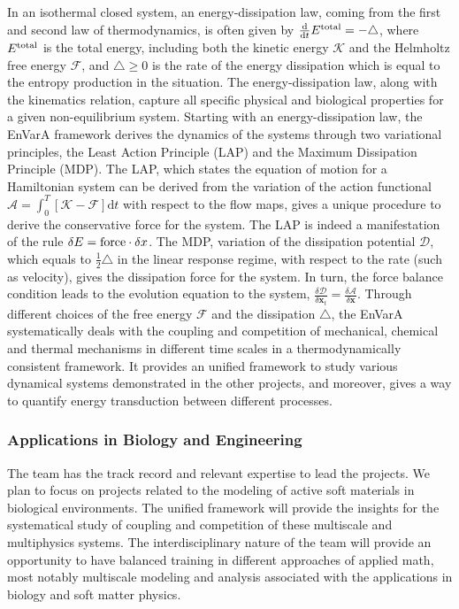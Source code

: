 \documentclass[11pt]{NSFamsart}
\newcommand{\dd}{\mathrm{d}}
\newcommand{\x}{{\bm x}}
\begin{document}
In an isothermal closed system, an energy-dissipation law, coming from the first and second law of thermodynamics, is often given by $\frac{\dd}{\dd t} E^{\rm total} = - \triangle$,
where $E^{\rm total}$ is the total energy, including both the kinetic energy $\mathcal{K}$ and the Helmholtz free energy $\mathcal{F}$, and $\triangle \geq 0$ is the rate of the energy dissipation which is equal to the entropy production in the situation. The energy-dissipation law, along with the kinematics relation, %
capture all specific physical and biological properties for a given non-equilibrium system. Starting with an energy-dissipation law, the EnVarA framework derives the dynamics of the systems through two variational principles, the Least Action Principle (LAP) and the Maximum Dissipation Principle (MDP). The LAP, which states the equation of motion for a Hamiltonian system
can be derived from the variation of the action functional $\mathcal{A} = \int_{0}^T [\mathcal{K} - \mathcal{F}] \dd t$ with respect to the flow maps, gives a unique procedure to derive the conservative force for the system. The LAP is indeed a manifestation of the rule $\delta E = {\rm force} \cdot \delta x$. The MDP, variation of the dissipation potential $\mathcal{D}$, which equals to $\frac{1}{2}\triangle$ in the linear response regime, with respect to the rate (such as velocity), gives the dissipation force for the system. In turn, the force balance condition leads to the evolution equation to the system, $\frac{\delta \mathcal{D}}{\delta \x_t} = \frac{\delta \mathcal{A}}{\delta \x}.$ Through different choices of the free energy $\mathcal{F}$ and the dissipation $\triangle$,
the EnVarA %
systematically deals with the coupling and competition of mechanical, chemical and thermal mechanisms in different time scales in a thermodynamically consistent framework. It 
provides an unified framework to study various
dynamical systems demonstrated in the other projects, and
moreover, gives a way to quantify energy transduction between different processes.  

\subsubsection*{Applications in Biology and Engineering}
The team has the track record and relevant expertise to lead the projects. We plan to focus on projects related to the modeling of active soft materials in biological environments. 
The unified framework will provide the insights for the systematical
study of coupling and competition of these multiscale and multiphysics systems.
The interdisciplinary nature of the team will provide an opportunity to have balanced training in different approaches of applied math, most notably multiscale modeling and analysis associated with the applications in biology and soft matter physics.
\end{document}
